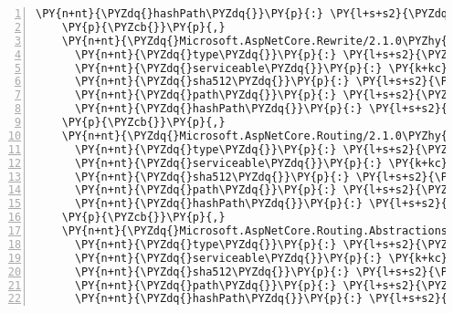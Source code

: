 \begin{Verbatim}[commandchars=\\\{\},numbers=left,firstnumber=1,stepnumber=1,numberblanklines=0]
      \PY{n+nt}{\PYZdq{}hashPath\PYZdq{}}\PY{p}{:} \PY{l+s+s2}{\PYZdq{}microsoft.aspnetcore.responsecompression.2.1.0\PYZhy{}rc1\PYZhy{}final.nupkg.sha512\PYZdq{}}
    \PY{p}{\PYZcb{}}\PY{p}{,}
    \PY{n+nt}{\PYZdq{}Microsoft.AspNetCore.Rewrite/2.1.0\PYZhy{}rc1\PYZhy{}final\PYZdq{}}\PY{p}{:} \PY{p}{\PYZob{}}
      \PY{n+nt}{\PYZdq{}type\PYZdq{}}\PY{p}{:} \PY{l+s+s2}{\PYZdq{}package\PYZdq{}}\PY{p}{,}
      \PY{n+nt}{\PYZdq{}serviceable\PYZdq{}}\PY{p}{:} \PY{k+kc}{true}\PY{p}{,}
      \PY{n+nt}{\PYZdq{}sha512\PYZdq{}}\PY{p}{:} \PY{l+s+s2}{\PYZdq{}sha512\PYZhy{}0uT37botRhgecfntnHAz6VQ+sHQZU8ZtS6Qt/uZwm4I9P7bC8/OZRtDhO5+wFHKynRQX5JR/d7g5WcQFPgtqyQ==\PYZdq{}}\PY{p}{,}
      \PY{n+nt}{\PYZdq{}path\PYZdq{}}\PY{p}{:} \PY{l+s+s2}{\PYZdq{}microsoft.aspnetcore.rewrite/2.1.0\PYZhy{}rc1\PYZhy{}final\PYZdq{}}\PY{p}{,}
      \PY{n+nt}{\PYZdq{}hashPath\PYZdq{}}\PY{p}{:} \PY{l+s+s2}{\PYZdq{}microsoft.aspnetcore.rewrite.2.1.0\PYZhy{}rc1\PYZhy{}final.nupkg.sha512\PYZdq{}}
    \PY{p}{\PYZcb{}}\PY{p}{,}
    \PY{n+nt}{\PYZdq{}Microsoft.AspNetCore.Routing/2.1.0\PYZhy{}rc1\PYZhy{}final\PYZdq{}}\PY{p}{:} \PY{p}{\PYZob{}}
      \PY{n+nt}{\PYZdq{}type\PYZdq{}}\PY{p}{:} \PY{l+s+s2}{\PYZdq{}package\PYZdq{}}\PY{p}{,}
      \PY{n+nt}{\PYZdq{}serviceable\PYZdq{}}\PY{p}{:} \PY{k+kc}{true}\PY{p}{,}
      \PY{n+nt}{\PYZdq{}sha512\PYZdq{}}\PY{p}{:} \PY{l+s+s2}{\PYZdq{}sha512\PYZhy{}kh7qKug9Yqg7o/Bg7w0syL+INbU2BvU3aG0CzhjEgp30MWpbbAoV52QU/jmWHkihQa17Kst8/OX94Lzo7NULAg==\PYZdq{}}\PY{p}{,}
      \PY{n+nt}{\PYZdq{}path\PYZdq{}}\PY{p}{:} \PY{l+s+s2}{\PYZdq{}microsoft.aspnetcore.routing/2.1.0\PYZhy{}rc1\PYZhy{}final\PYZdq{}}\PY{p}{,}
      \PY{n+nt}{\PYZdq{}hashPath\PYZdq{}}\PY{p}{:} \PY{l+s+s2}{\PYZdq{}microsoft.aspnetcore.routing.2.1.0\PYZhy{}rc1\PYZhy{}final.nupkg.sha512\PYZdq{}}
    \PY{p}{\PYZcb{}}\PY{p}{,}
    \PY{n+nt}{\PYZdq{}Microsoft.AspNetCore.Routing.Abstractions/2.1.0\PYZhy{}rc1\PYZhy{}final\PYZdq{}}\PY{p}{:} \PY{p}{\PYZob{}}
      \PY{n+nt}{\PYZdq{}type\PYZdq{}}\PY{p}{:} \PY{l+s+s2}{\PYZdq{}package\PYZdq{}}\PY{p}{,}
      \PY{n+nt}{\PYZdq{}serviceable\PYZdq{}}\PY{p}{:} \PY{k+kc}{true}\PY{p}{,}
      \PY{n+nt}{\PYZdq{}sha512\PYZdq{}}\PY{p}{:} \PY{l+s+s2}{\PYZdq{}sha512\PYZhy{}rXg1ZOjzxXK4i5OIdaZmVC6ND9iNUow4QPSVvA4LzwQQ+rw4mnt1zy3CYxFluih7yntdn6bAiQg6/zFLe9g8cg==\PYZdq{}}\PY{p}{,}
      \PY{n+nt}{\PYZdq{}path\PYZdq{}}\PY{p}{:} \PY{l+s+s2}{\PYZdq{}microsoft.aspnetcore.routing.abstractions/2.1.0\PYZhy{}rc1\PYZhy{}final\PYZdq{}}\PY{p}{,}
      \PY{n+nt}{\PYZdq{}hashPath\PYZdq{}}\PY{p}{:} \PY{l+s+s2}{\PYZdq{}microsoft.aspnetcore.routing.abstractions.2.1.0\PYZhy{}rc1\PYZhy{}final.nupkg.sha512\PYZdq{}}

\end{Verbatim}
